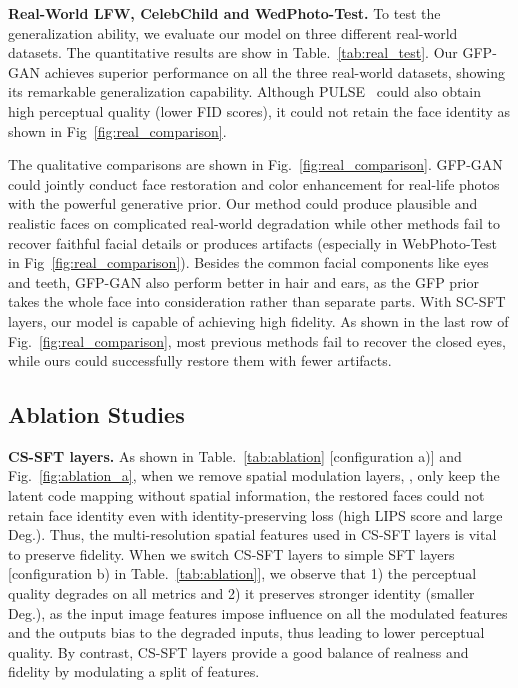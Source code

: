\documentclass[final]{cvpr}
\begin{document}
\noindent\textbf{Real-World LFW, CelebChild and WedPhoto-Test.}
To test the generalization ability, we evaluate our model on three different real-world datasets.
The quantitative results are show in Table.~\ref{tab:real_test}. 
Our GFP-GAN achieves superior performance on all the three real-world datasets, showing its remarkable generalization capability.  Although PULSE~\cite{menon2020pulse} could also obtain high perceptual quality (lower FID scores), it could not retain the face identity as shown in Fig~\ref{fig:real_comparison}.



The qualitative comparisons are shown in Fig.~\ref{fig:real_comparison}.
GFP-GAN could jointly conduct face restoration and color enhancement for real-life photos with the powerful generative prior. 
Our method could produce plausible and realistic faces on complicated real-world degradation while other methods fail to recover faithful facial details or produces artifacts (especially in WebPhoto-Test in Fig~\ref{fig:real_comparison}).
Besides the common facial components like eyes and teeth, GFP-GAN also perform better in hair and ears, as the GFP prior takes the whole face into consideration rather than separate parts.
With SC-SFT layers, our model is capable of achieving high fidelity. As shown in the last row of Fig.~\ref{fig:real_comparison}, most previous methods fail to recover the closed eyes, while ours could successfully restore them with fewer artifacts.




\subsection{Ablation Studies}\label{subsec:image_to_image_translation}


\noindent\textbf{CS-SFT layers.}
As shown in Table.~\ref{tab:ablation} [configuration a)] and Fig.~\ref{fig:ablation_a}, when we remove spatial modulation layers, \ie, only keep the latent code mapping without spatial information, the restored faces could not retain face identity even with identity-preserving loss (high LIPS score and large Deg.). Thus, the multi-resolution spatial features used in CS-SFT layers is vital to preserve fidelity. 
When we switch CS-SFT layers to simple SFT layers [configuration b) in Table.~\ref{tab:ablation}], we observe that 1) the perceptual quality degrades on all metrics and 2) it preserves stronger identity (smaller Deg.), as the input image features impose influence on all the modulated features and the outputs bias to the degraded inputs, thus leading to lower perceptual quality. By contrast, CS-SFT layers provide a good balance of realness and fidelity by modulating a split of features. 
 
\end{document}
